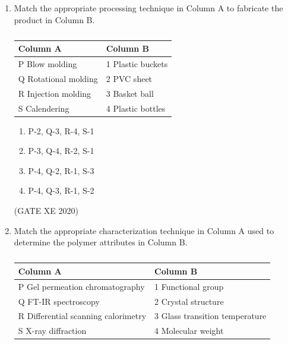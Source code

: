 \documentclass[12pt]{article}
\begin{document}
\begin{enumerate}
\begin{enumerate}
\item  P-3, Q-2, R-4, S-1
\item  P-4, Q-3, R-2, S-1
\item  P-2, Q-3, R-4, S-1
\item  P-1, Q-3, R-4, S-2
\end{enumerate}

(GATE XE 2020)

\item Match the appropriate processing technique in Column A to fabricate the product in Column B.

\begin{table}[H]
\centering
\caption{}
\label{}
\begin{tabular}{|l|l|}
\hline
\textbf{Column A} & \textbf{Column B} \\ \hline
P\; Blow molding         & 1\; Plastic buckets \\ \hline
Q\; Rotational molding   & 2\; PVC sheet \\ \hline
R\; Injection molding    & 3\; Basket ball \\ \hline
S\; Calendering          & 4\; Plastic bottles \\ \hline
\end{tabular}
\end{table}

\begin{enumerate}
\item  P-2, Q-3, R-4, S-1
\item  P-3, Q-4, R-2, S-1
\item  P-4, Q-2, R-1, S-3
\item  P-4, Q-3, R-1, S-2
\end{enumerate}

(GATE XE 2020)

\item Match the appropriate characterization technique in Column A used to determine the polymer attributes in Column B.

\begin{table}[H]
\centering
\caption{} \label{}
\begin{tabular}{|l|l|}
\hline
\textbf{Column A} & \textbf{Column B} \\ \hline
P\; Gel permeation chromatography & 1\; Functional group \\ \hline
Q\; FT-IR spectroscopy            & 2\; Crystal structure \\ \hline
R\; Differential scanning calorimetry & 3\; Glass transition temperature \\ \hline
S\; X-ray diffraction             & 4\; Molecular weight \\ \hline
\end{tabular}
\end{table}


\end{enumerate}
\end{document}
